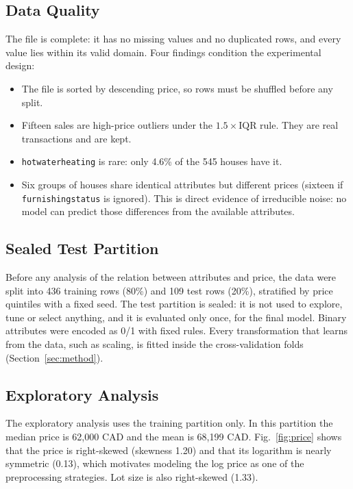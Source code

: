 \documentclass[conference]{IEEEtran}
\begin{document}
\subsection{Data Quality}

The file is complete: it has no missing values and no duplicated rows, and every value lies within its valid domain. Four findings condition the experimental design:
\begin{itemize}
  \item The file is sorted by descending price, so rows must be shuffled before any split.
  \item Fifteen sales are high-price outliers under the $1.5 \times \text{IQR}$ rule. They are real transactions and are kept.
  \item \texttt{hotwaterheating} is rare: only 4.6\% of the 545 houses have it.
  \item Six groups of houses share identical attributes but different prices (sixteen if \texttt{furnishingstatus} is ignored). This is direct evidence of irreducible noise: no model can predict those differences from the available attributes.
\end{itemize}

\subsection{Sealed Test Partition}

Before any analysis of the relation between attributes and price, the data were split into 436 training rows (80\%) and 109 test rows (20\%), stratified by price quintiles with a fixed seed. The test partition is sealed: it is not used to explore, tune or select anything, and it is evaluated only once, for the final model. Binary attributes were encoded as 0/1 with fixed rules. Every transformation that learns from the data, such as scaling, is fitted inside the cross-validation folds (Section~\ref{sec:method}).

\subsection{Exploratory Analysis}

The exploratory analysis uses the training partition only. In this partition the median price is 62,000 CAD and the mean is 68,199 CAD. Fig.~\ref{fig:price} shows that the price is right-skewed (skewness 1.20) and that its logarithm is nearly symmetric (0.13), which motivates modeling the log price as one of the preprocessing strategies. Lot size is also right-skewed (1.33).
\end{document}
